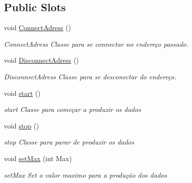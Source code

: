 \subsection*{Public Slots}
\begin{DoxyCompactItemize}
\item 
\mbox{\label{class_main_window_a3613ef775489a7934cbb2f2a0c241a74}} 
void \mbox{\hyperlink{class_main_window_a3613ef775489a7934cbb2f2a0c241a74}{Connect\+Adress}} ()
\begin{DoxyCompactList}\small\item\em Connect\+Adress Classe para se connectar no endereço passado. \end{DoxyCompactList}\item 
\mbox{\label{class_main_window_a6d91a01cd024fa6141b888116b8fe7e9}} 
void \mbox{\hyperlink{class_main_window_a6d91a01cd024fa6141b888116b8fe7e9}{Disconnect\+Adress}} ()
\begin{DoxyCompactList}\small\item\em Disconnect\+Adress Classe para se desconectar do endereço. \end{DoxyCompactList}\item 
\mbox{\label{class_main_window_a5edcbc314e782645cdf4db101eeb247d}} 
void \mbox{\hyperlink{class_main_window_a5edcbc314e782645cdf4db101eeb247d}{start}} ()
\begin{DoxyCompactList}\small\item\em start Classe para começar a produzir os dados \end{DoxyCompactList}\item 
\mbox{\label{class_main_window_a939e90ddfe07d74be87b351ca2171fb0}} 
void \mbox{\hyperlink{class_main_window_a939e90ddfe07d74be87b351ca2171fb0}{stop}} ()
\begin{DoxyCompactList}\small\item\em stop Classe para parar de produzir os dados \end{DoxyCompactList}\item 
void \mbox{\hyperlink{class_main_window_abd23e6005d51e6a4426cfa39f88e0ba6}{set\+Max}} (int Max)
\begin{DoxyCompactList}\small\item\em set\+Max Set o valor maximo para a produção dos dados \end{DoxyCompactList}\item 

\end{DoxyCompactItemize}
